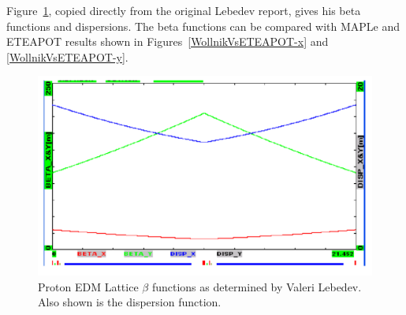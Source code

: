 \documentclass[12]{article}
\begin{document}
Figure~\ref{fig:ValLeb2Twiss}, copied directly from the original Lebedev report,
gives his beta functions and dispersions. The beta functions can be compared 
with MAPLe and ETEAPOT results shown in
Figures~\ref{WollnikVsETEAPOT-x} and \ref{WollnikVsETEAPOT-y}.
%
\begin{figure}[hbt]
\centering
\includegraphics[scale=0.35]{pdf/ValLeb2-twiss.pdf}
\caption{\label{fig:ValLeb2Twiss}Proton EDM Lattice $\beta$ functions as determined by
Valeri Lebedev\cite{ValLeb2}. Also shown is the dispersion function.}
\end{figure}
\end{document}
